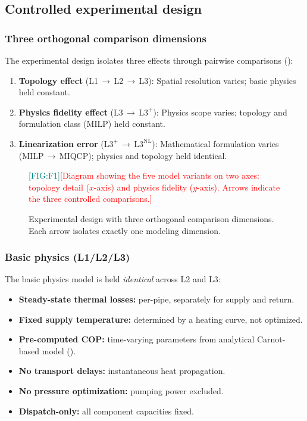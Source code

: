 \documentclass[review,3p]{elsarticle}
\newcommand{\placeholder}[1]{\textcolor{red}{[#1]}}
\newcommand{\Lplus}{\mathrm{L3}^{+}}
\newcommand{\Lnl}{\mathrm{L3}^{\mathrm{NL}}}
\newcommand{\figref}[1]{\textcolor{teal}{[FIG:#1]}}
\begin{document}
\subsection{Controlled experimental design}
\label{sec:exp_design}

\subsubsection{Three orthogonal comparison dimensions}

The experimental design isolates three effects through pairwise
comparisons ():
%
\begin{enumerate}[nosep]
  \item \textbf{Topology effect} (L1\,$\to$\,L2\,$\to$\,L3):
        Spatial resolution varies; basic physics held constant.
  \item \textbf{Physics fidelity effect} (L3\,$\to$\,$\Lplus$):
        Physics scope varies; topology and formulation class (MILP)
        held constant.
  \item \textbf{Linearization error}
        ($\Lplus$\,$\to$\,$\Lnl$): Mathematical formulation varies
        (MILP\,$\to$\,MIQCP); physics and topology held identical.
\end{enumerate}

\begin{figure}[htbp]
  \centering
  \figref{F1}\quad\placeholder{Diagram showing the five model variants
  on two axes: topology detail ($x$-axis) and physics fidelity
  ($y$-axis). Arrows indicate the three controlled comparisons.}
  \caption{Experimental design with three orthogonal comparison
  dimensions. Each arrow isolates exactly one modeling dimension.}
  \label{fig:comparison_design}
\end{figure}

\subsubsection{Basic physics (L1/L2/L3)}

The basic physics model is held \emph{identical} across L2 and L3:
%
\begin{itemize}[nosep]
  \item \textbf{Steady-state thermal losses:} per-pipe, separately
        for supply and return.
  \item \textbf{Fixed supply temperature:} determined by a heating
        curve, not optimized.
  \item \textbf{Pre-computed COP:} time-varying parameters from
        analytical Carnot-based model ().
  \item \textbf{No transport delays:} instantaneous heat propagation.
  \item \textbf{No pressure optimization:} pumping power excluded.
  \item \textbf{Dispatch-only:} all component capacities fixed.
\end{itemize}
\end{document}
